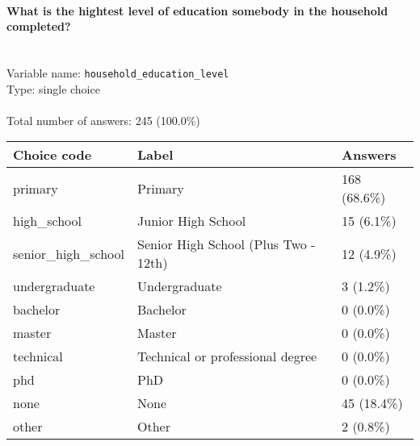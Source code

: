 \documentclass[11.5pt, a4paper]{scrartcl}
\begin{document}
\paragraph{What is the hightest level of education somebody in the household completed?}
\  \\Variable name: \texttt{household\_education\_level}\\
Type: single choice\\
\\Total number of answers: 245 (100.0\%)
\\[0.2em] \begin{tabular}{p{4cm}|p{8cm}|p{3cm}}
Choice code & Label & Answers \\
\hline
primary & Primary& \cellcolor{color3}168 (68.6\%)\\
\cellcolor{mygray} high\_school & \cellcolor{mygray}Junior High School & \cellcolor{color0}15 (6.1\%)\\
senior\_high\_school & Senior High School (Plus Two - 12th)& \cellcolor{color0}12 (4.9\%)\\
\cellcolor{mygray} undergraduate & \cellcolor{mygray}Undergraduate & \cellcolor{color0}3 (1.2\%)\\
bachelor & Bachelor& \cellcolor{color0}0 (0.0\%)\\
\cellcolor{mygray} master & \cellcolor{mygray}Master & \cellcolor{color0}0 (0.0\%)\\
technical & Technical or professional degree& \cellcolor{color0}0 (0.0\%)\\
\cellcolor{mygray} phd & \cellcolor{mygray}PhD & \cellcolor{color0}0 (0.0\%)\\
none & None& \cellcolor{color0}45 (18.4\%)\\
\cellcolor{mygray} other & \cellcolor{mygray}Other & \cellcolor{color0}2 (0.8\%)\\
\end{tabular}
\end{document}

